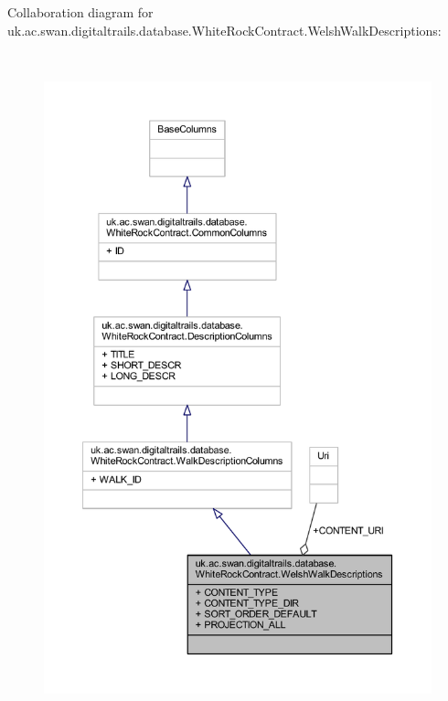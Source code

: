 Collaboration diagram for uk.\+ac.\+swan.\+digitaltrails.\+database.\+White\+Rock\+Contract.\+Welsh\+Walk\+Descriptions\+:
\nopagebreak
\begin{figure}[H]
\begin{center}
\leavevmode
\includegraphics[height=550pt]{classuk_1_1ac_1_1swan_1_1digitaltrails_1_1database_1_1_white_rock_contract_1_1_welsh_walk_descriptions__coll__graph}
\end{center}
\end{figure}

